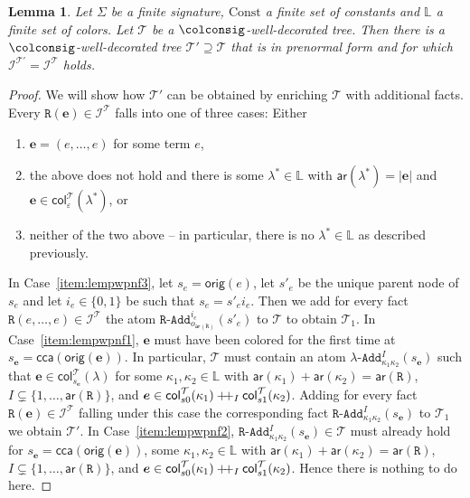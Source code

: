 \documentclass[10pt,a4paper]{amsart}
\theoremstyle{definition}
\numberwithin{equation}{section}
\theoremstyle{plain}
\newtheorem{lemma}[lemma]{Lemma}
\theoremstyle{definition}
\theoremstyle{myexample}
\theoremstyle{plain}
\theoremstyle{definition}
\renewcommand{\vec}[1]{\boldsymbol{#1}}
\newcommand{\instance}{\mathcal{I}}
\newcommand{\inst}{\instance}
\newcommand{\origcol}{o}
\newcommand{\cols}{\mathbb{L}}
\newcommand{\arity}[1]{\fcn{ar}(#1)}
\newcommand{\cadd}[4]{#4\pred{\texttt{-}Add}^{#3}_{#1#2}} %
\newcommand{\radd}[4]{#4\pred{\texttt{-}Add}^{#3}_{#1#2}}
\newcommand{\unradd}[2]{#2\pred{\texttt{-}Add}_{#1}}
\newcommand{\fcn}[1]{\mathsf{#1}}
\newcommand{\col}{\fcn{col}}
\newcommand{\pred}[1]{\mathtt{#1}}
\newcommand{\ve}{\vec{e}}
\newcommand{\rpred}{\pred{R}}
\newcommand{\concat}{\mathbin{{+}\hspace{-0.5ex}{+}}}
\begin{document}
\begin{lemma}\label{lem:toprenf}
	Let $\Sigma$ be a finite signature, $\mathrm{Const}$ a finite set of constants and $\cols$ a finite set of colors. Let $\mathcal{T}$ be a $\colconsig$-well-decorated tree. Then there is a  $\colconsig$-well-decorated tree $\mathcal{T}'\supseteq \mathcal{T}$ that is in prenormal form and for which $\inst^{\mathcal{T}'} = \inst^{\mathcal{T}}$ holds.
\end{lemma}
\begin{proof} We will show how $\mathcal{T}'$ can be obtained by enriching $\mathcal{T}$ with additional facts.
	Every $\rpred(\ve)\in\inst^{\mathcal{T}}$ falls into one of three cases: Either
	\begin{enumerate}
		\item\label{item:lempwpnf3} $\ve = (e, \ldots, e)$ for some term $e$,
		\item\label{item:lempwpnf1} the above does not hold and there is some $\lambda^*\in\cols$ with $\arity{\lambda^*} = |\ve|$ and $\ve\in\col_{\varepsilon}^{\mathcal{T}}(\lambda^*)$, or
		\item\label{item:lempwpnf2} neither of the two above -- in particular, there is no  $\lambda^*\in\cols$ as described previously. 
	\end{enumerate}
    In Case~\ref{item:lempwpnf3}, let $s_e = \fcn{orig}(e)$, let $s'_e$ be the unique parent node of $s_e$ and let $i_e\in\{ 0,1 \}$ be such that $s_e = s'_ei_e$. Then we add for every fact $\rpred(e, \ldots, e)\in\inst^{\mathcal{T}}$ the atom $\unradd{\origcol_{\arity{\rpred}}}{\rpred}^{i_e}(s'_e)$ to $\mathcal{T}$ to obtain $\mathcal{T}_1$.
	\newline
	In Case~\ref{item:lempwpnf1}, $\ve$ must have been colored for the first time at $s_{\ve} = \fcn{cca}(\fcn{orig}(\ve))$. In particular, $\mathcal{T}$ must contain an atom  $\cadd{\kappa_1}{\kappa_2}{I}{\lambda}(s_{\ve})$ such that $\ve\in\col_{s_{\ve}}^{\mathcal{T}}(\lambda)$ for some $\kappa_1, \kappa_2\in\cols$ with $\arity{\kappa_1}+\arity{\kappa_2} = \arity{\rpred}$, $I\subsetneq \{ 1, \ldots, \arity{\rpred}\}$, and $\ve \in \col_{s0}^{\mathcal{T}}(\kappa_1) \concat_{I} \col_{s1}^{\mathcal{T}}(\kappa_2)$.
	Adding for every fact $\rpred(\ve)\in\inst^{\mathcal{T}}$ falling under this case the corresponding fact $\radd{\kappa_1}{\kappa_2}{I}{\rpred}(s_{\ve})$ to $\mathcal{T}_1$ we obtain $\mathcal{T}'$.
	\newline
	In Case~\ref{item:lempwpnf2}, $\radd{\kappa_1}{\kappa_2}{I}{\rpred}(s_{\ve})\in\mathcal{T}$ must already hold for $s_{\ve} = \fcn{cca}(\fcn{orig}(\ve))$, some $\kappa_1, \kappa_2\in\cols$ with $\arity{\kappa_1}+\arity{\kappa_2} = \arity{\rpred}$, $I\subsetneq \{ 1, \ldots, \arity{\rpred}\}$, and $\ve \in \col_{s0}^{\mathcal{T}}(\kappa_1) \concat_{I} \col_{s1}^{\mathcal{T}}(\kappa_2)$. Hence there is nothing to do here.
	\newline
	

\end{proof}
\end{document}
